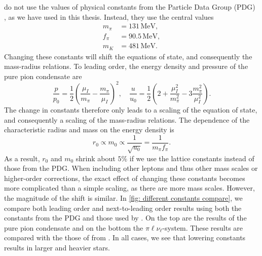 \citeauthor{brandtNewClassCompact2018} do not use the values of physical constants from the Particle Data Group (PDG) \autocite{particledatagroupReviewParticlePhysics2020}, as we have used in this thesis.
Instead, they use the central values~\autocite{adhikariQuarkPionAxial2021}
%
\begin{align}
    m_\pi &= 131\,\text{MeV},\\
    f_\pi &= 90.5\,\text{MeV},\\
    m_K &= 481\,\text{MeV}.
\end{align}
%
Changing these constants will shift the equations of state, and consequently the mass-radius relations.
To leading order, the energy density and pressure of the pure pion condensate are
%
\begin{equation}
    \frac{p}{p_0} = \frac{1}{2} \left(\frac{\mu_I}{m_\pi} - \frac{m_\pi}{\mu_I}\right)^2,
    \quad
    \frac{u}{u_0}
    = \frac{1}{2} \left(2 + \frac{\mu_I^2}{m_\pi^2} - 3\frac{m_\pi^2}{\mu_I^2}\right).
\end{equation}
%
The change in constants therefore only leads to a scaling of the equation of state, and consequently a scaling of the mass-radius relations.
The dependence of the characteristic radius and mass on the energy density is
%
\begin{equation}
    r_0 \propto m_0 \propto \frac{1}{\sqrt{u_0}} = \frac{1}{m_\pi f_\pi}.
\end{equation}
%
As a result, $r_0$ and $m_0$ shrink about $5\%$ if we use the lattice constants instead of those from the PDG.
When including other leptons and thus other mass scales or higher-order corrections, the exact effect of changing these constants becomes more complicated than a simple scaling, as there are more mass scales.
However, the magnitude of the shift is similar.
In \autoref{fig: different constants compare}, we compare both leading order and next-to-leading order results using both the constants from the PDG and those used by \citeauthor{brandtNewClassCompact2018}.
On the top are the results of the pure pion condensate and on the bottom the $\pi\ell\nu_\ell$-system.
These results are compared with the those of \citeauthor{brandtNewClassCompact2018} from \autocite{brandtNewClassCompact2018}.
In all cases, we see that lowering constants results in larger and heavier stars.

